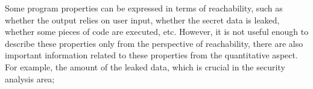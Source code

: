 
Some program properties can be expressed in terms of reachability,
such as
whether the output relies on user input, whether the secret data is leaked, 
whether some pieces of code are executed, etc.
However, it is not useful enough to describe these properties only
from the perspective of reachability,
there are also
important information related to these properties from the quantitative aspect.
For example, the amount of the leaked data, which is crucial in the security analysis area;
